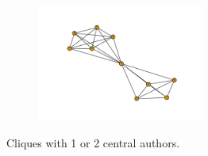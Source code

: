 \documentclass{article}
\begin{document}
\begin{center}
\begin{figure}[!hbtp]
\begin{subfigure}{0.6\textwidth}
    \end{subfigure}
    \begin{subfigure}{0.6\textwidth}
        \includegraphics[width=0.6\textwidth]{./assets/images/coauthor07.pdf}
    \end{subfigure}
\caption{Cliques with 1 or 2 central authors.}\label{fig:cliques_0}
\end{figure} %
\end{center}
\end{document}
